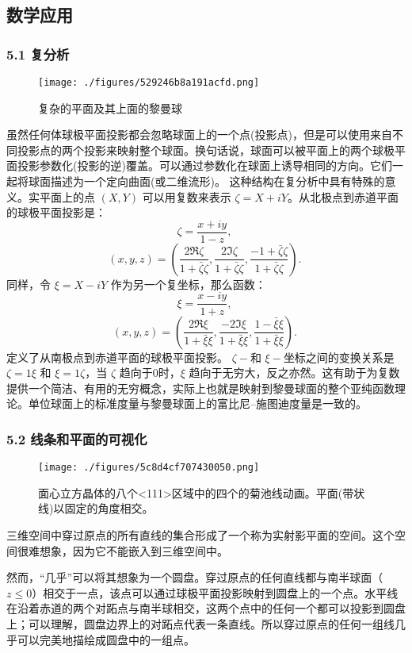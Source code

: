 \subsection{数学应用}
\subsubsection{5.1 复分析}
\begin{figure}[ht]
\centering
\texttt{[image: ./figures/529246b8a191acfd.png]}
\caption{复杂的平面及其上面的黎曼球} \label{fig_QJPMTY_17}
\end{figure}
虽然任何体球极平面投影都会忽略球面上的一个点(投影点)，但是可以使用来自不同投影点的两个投影来映射整个球面。换句话说，球面可以被平面上的两个球极平面投影参数化(投影的逆)覆盖。可以通过参数化在球面上诱导相同的方向。它们一起将球面描述为一个定向曲面(或二维流形)。
这种结构在复分析中具有特殊的意义。实平面上的点 $(X, Y)$ 可以用复数来表示 $\zeta = X + iY$。从北极点到赤道平面的球极平面投影是：
$$\zeta = \frac{x + iy}{1 - z},~$$
$$(x, y, z) = \left( \frac{2 \Re \zeta}{1 + \bar{\zeta}\zeta }, \frac{2 \Im \zeta}{1 + \bar{\zeta}\zeta }, \frac{-1 + \bar{\zeta}\zeta }{1 + \bar{\zeta}\zeta } \right).~$$
同样，令 $\xi = X - iY$ 作为另一个复坐标，那么函数：
$$\xi = \frac{x - iy}{1 + z},~$$
$$(x, y, z) = \left( \frac{2 \Re \xi}{1 +\bar{\xi} \xi }, \frac{-2 \Im \xi}{1 + \bar{\xi}\xi }, \frac{1 -\bar{\xi} \xi}{1 + \bar{\xi}\xi } \right).~$$
定义了从南极点到赤道平面的球极平面投影。 $\zeta-$和 $\xi-$坐标之间的变换关系是 $\zeta = 1\xi$ 和 $\xi = 1\zeta$，当 $\zeta$ 趋向于0时，$\xi$ 趋向于无穷大，反之亦然。这有助于为复数提供一个简洁、有用的无穷概念，实际上也就是映射到黎曼球面的整个亚纯函数理论。单位球面上的标准度量与黎曼球面上的富比尼–施图迪度量是一致的。
\subsubsection{5.2 线条和平面的可视化}
\begin{figure}[ht]
\centering
\texttt{[image: ./figures/5c8d4cf707430050.png]}
\caption{面心立方晶体的八个<111>区域中的四个的菊池线动画。平面(带状线)以固定的角度相交。} \label{fig_QJPMTY_18}
\end{figure}
三维空间中穿过原点的所有直线的集合形成了一个称为实射影平面的空间。这个空间很难想象，因为它不能嵌入到三维空间中。

然而，“几乎”可以将其想象为一个圆盘。穿过原点的任何直线都与南半球面（$z \leq 0$）相交于一点，该点可以通过球极平面投影映射到圆盘上的一个点。水平线在沿着赤道的两个对跖点与南半球相交，这两个点中的任何一个都可以投影到圆盘上；可以理解，圆盘边界上的对跖点代表一条直线。所以穿过原点的任何一组线几乎可以完美地描绘成圆盘中的一组点。

